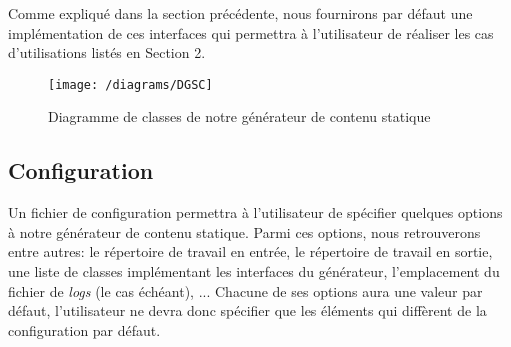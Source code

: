 		Comme expliqué dans la section précédente, nous fournirons par défaut une implémentation de ces interfaces qui permettra à l'utilisateur de réaliser les cas d'utilisations listés en Section 2.
		
		\begin{figure}
			\texttt{[image: /diagrams/DGSC]}
			\caption{Diagramme de classes de notre générateur de contenu statique}
			\label{fig:class_diagram}
		\end{figure} 
	
	
	\subsection{Configuration}
		Un fichier de configuration permettra à l'utilisateur de spécifier quelques options à notre générateur de contenu statique. Parmi ces options, nous retrouverons entre autres: le répertoire de travail en entrée, le répertoire de travail en sortie, une liste de classes implémentant les interfaces du générateur, l'emplacement du fichier de \textit{logs} (le cas échéant), ... Chacune de ses options aura une valeur par défaut, l'utilisateur ne devra donc spécifier que les éléments qui diffèrent de la configuration par défaut. 